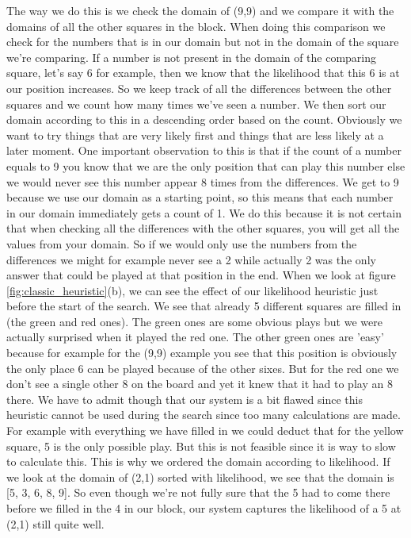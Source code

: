\documentclass{report}
\begin{document}
The way we do this is we check the domain of (9,9) and we compare it with the domains of all the other squares in the block. When doing this comparison we check for the numbers that is in our domain but not in the domain of the square we're comparing. If a number is not present in the domain of the comparing square, let's say 6 for example, then we know that the likelihood that this 6 is at our position increases. So we keep track of all the differences between the other squares and we count how many times we've seen a number. We then sort our domain according to this in a descending order based on the count. Obviously we want to try things that are very likely first and things that are less likely at a later moment. One important observation to this is that if the count of a number equals to 9 you know that we are the only position that can play this number else we would never see this number appear 8 times from the differences. We get to 9 because we use our domain as a starting point, so this means that each number in our domain immediately gets a count of 1. We do this because it is not certain that when checking all the differences with the other squares, you will get all the values from your domain. So if we would only use the numbers from the differences we might for example never see a 2 while actually 2 was the only answer that could be played at that position in the end.
\newline
\newline
 When we look at figure \ref{fig:classic_heuristic}(b), we can see the effect of our likelihood heuristic just before the start of the search. We see that already 5 different squares are filled in (the green and red ones). The green ones are some obvious plays but we were actually surprised when it played the red one. The other green ones are 'easy' because for example for the (9,9) example you see that this position is obviously the only place 6 can be played because of the other sixes. But for the red one we don't see a single other 8 on the board and yet it knew that it had to play an 8 there. We have to admit though that our system is a bit flawed since this heuristic cannot be used during the search since too many calculations are made. For example with everything we have filled in we could deduct that for the yellow square, 5 is the only possible play. But this is not feasible since it is way to slow to calculate this. This is why we ordered the domain according to likelihood. If we look at the domain of (2,1) sorted with likelihood, we see that the domain is [5, 3, 6, 8, 9]. So even though we're not fully sure that the 5 had to come there before we filled in the 4 in our block, our system captures the likelihood of a 5 at (2,1) still quite well.
\end{document}
